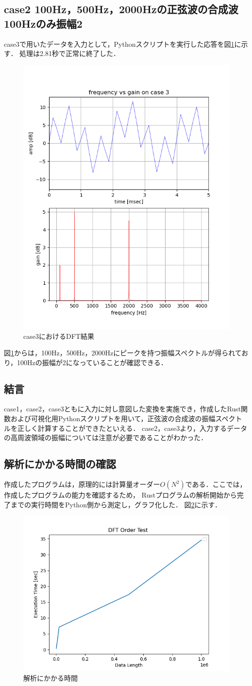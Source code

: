 \documentclass[dvipdfmx,titlepage,a4j]{jsarticle}  %
\begin{document}
\subsection{case2 100Hz，500Hz，2000Hzの正弦波の合成波 100Hzのみ振幅2}
case3で用いたデータを入力として，Pythonスクリプトを実行した応答を図\ref{case3}に示す．
処理は2.81秒で正常に終了した．
\begin{figure}[H]
  \centering
  \includegraphics[width=0.4\linewidth]{../picture/case3.png}
  \caption{case3におけるDFT結果}
  \label{case3}
\end{figure}
図\ref{case3}からは，100Hz，500Hz，2000Hzにピークを持つ振幅スペクトルが得られており，100Hzの振幅が2になっていることが確認できる．

\subsection{結言}
case1，case2，case3ともに入力に対し意図した変換を実施でき，作成したRust関数および可視化用Pythonスクリプトを用いて，正弦波の合成波の振幅スペクトルを正しく計算することができたといえる．
case2，case3より，入力するデータの高周波領域の振幅については注意が必要であることがわかった．

\subsection{解析にかかる時間の確認}
作成したプログラムは，原理的には計算量オーダー$O(N^2)$である．ここでは，作成したプログラムの能力を確認するため，
Rustプログラムの解析開始から完了までの実行時間をPython側から測定し，グラフ化した．
図\ref{time}に示す．
\begin{figure}[H]
  \centering
  \includegraphics[width=0.5\linewidth]{../picture/order.png}
  \caption{解析にかかる時間}
  \label{time}
\end{figure}
\end{document}
